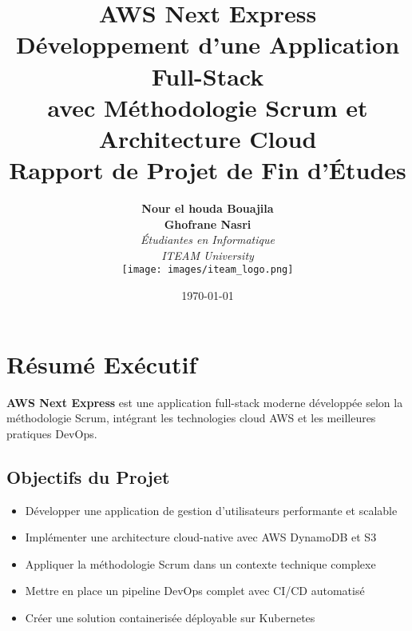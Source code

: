 \documentclass[12pt,a4paper]{report}
\title{\textbf{\Huge AWS Next Express}\\[0.5cm]
       {\Large Développement d'une Application Full-Stack}\\[0.2cm]
       {\Large avec Méthodologie Scrum et Architecture Cloud}\\[1cm]
       {\large Rapport de Projet de Fin d'Études}}
\author{
    \textbf{Nour el houda Bouajila} \\
    \textbf{Ghofrane Nasri} \\[1cm]
    \textit{Étudiantes en Informatique} \\
    \textit{ITEAM University} \\[1cm]
    \texttt{[image: images/iteam\_logo.png]}
}
\date{\today}
\begin{document}


\tableofcontents
\newpage

\listoffigures
\newpage

\listoftables
\newpage











\appendix





\chapter*{Résumé Exécutif}

\textbf{AWS Next Express} est une application full-stack moderne développée selon la méthodologie Scrum, intégrant les technologies cloud AWS et les meilleures pratiques DevOps.

\section*{Objectifs du Projet}
\begin{itemize}
    \item Développer une application de gestion d'utilisateurs performante et scalable
    \item Implémenter une architecture cloud-native avec AWS DynamoDB et S3
    \item Appliquer la méthodologie Scrum dans un contexte technique complexe
    \item Mettre en place un pipeline DevOps complet avec CI/CD automatisé
    \item Créer une solution containerisée déployable sur Kubernetes
\end{itemize}
\end{document}
